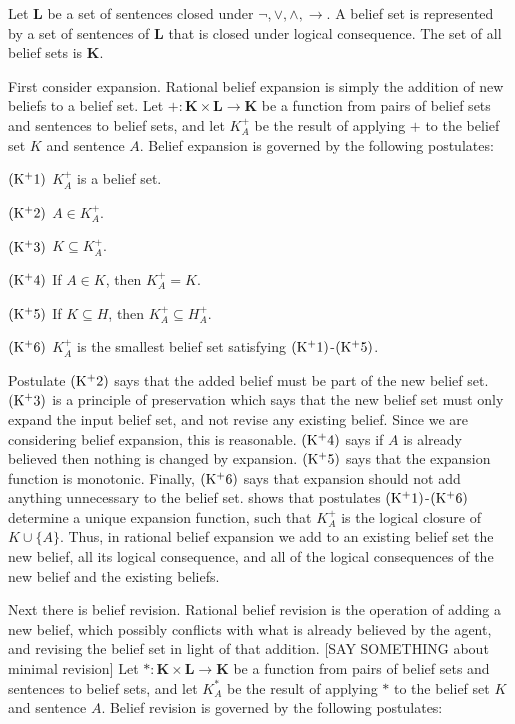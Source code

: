 \documentclass[12pt]{article}
\begin{document}
Let \textbf{L} be a set of sentences closed under $\neg,\lor,\land,\rightarrow$. A belief set is represented by a set of sentences of \textbf{L} that is closed under logical consequence. The set of all belief sets is \textbf{K}.

First consider expansion. Rational belief expansion is simply the addition of new beliefs to a belief set. Let $+: \textbf{K}\times\textbf{L} \rightarrow \textbf{K}$ be a function from pairs of belief sets and sentences to belief sets, and let $K_A^+$ be the result of applying $+$ to the belief set $K$ and sentence $A$. Belief expansion is governed by the following postulates:

$\pst{+1}$ $K_A^+$ is a belief set.

$\pst{+2}$ $A\in K_A^+$.

$\pst{+3}$ $K \subseteq K_A^+$.

$\pst{+4}$ If $A\in K$, then $K_A^+ = K$.

$\pst{+5}$ If $K\subseteq H$, then $K_A^+ \subseteq H_A^+$.

$\pst{+6}$ $K_A^+$ is the smallest belief set satisfying $\pst{+1}$-$\pst{+5}$.

Postulate $\pst{+2}$ says that the added belief must be part of the new belief set. $\pst{+3}$ is a principle of preservation which says that the new belief set must only expand the input belief set, and not revise any existing belief. Since we are considering belief expansion, this is reasonable. $\pst{+4}$ says if $A$ is already believed then nothing is changed by expansion. $\pst{+5}$ says that the expansion function is monotonic. Finally, $\pst{+6}$ says that expansion should not add anything unnecessary to the belief set. \gf{} shows that postulates $\pst{+1}$-$\pst{+6}$ determine a unique expansion function, such that $K_A^+$ is the logical closure of $K\cup \{A\}$. Thus, in rational belief expansion we add to an existing belief set the new belief, all its logical consequence, and all of the logical consequences of the new belief and the existing beliefs.

Next there is belief revision. Rational belief revision is the operation of adding a new belief, which possibly conflicts with what is already believed by the agent, and revising the belief set in light of that addition. [SAY SOMETHING about minimal revision]
Let $*: \textbf{K}\times\textbf{L} \rightarrow \textbf{K}$ be a function from pairs of belief sets and sentences to belief sets, and let $K_A^*$ be the result of applying $*$ to the belief set $K$ and sentence $A$. Belief revision is governed by the following postulates:
\end{document}
